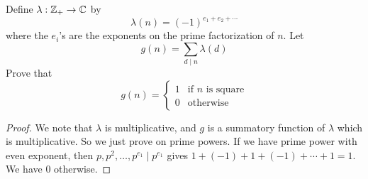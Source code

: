 \begin{problem}
Define $\lambda : \mathbb Z_+\to \mathbb C$ by
\[\lambda(n) = (-1)^{e_1 + e_2 + \cdots}\]
where the $e_i$'s are the exponents on the prime factorization of $n$. Let
\[g(n) = \sum_{d\mid n}\lambda(d)\]
Prove that
\[g(n) = \begin{cases}
        1 & \text{if $n$ is square} \\
        0 & \text{otherwise}
    \end{cases}\]
\end{problem}
\begin{proof}
    We note that $\lambda$ is multiplicative, and $g$ is a summatory function of $\lambda$ which is multiplicative. So we just prove on prime powers. If we have prime power with even exponent, then $p, p^2, \dots, p^{e_1}\mid p^{e_1}$ gives $1 + (-1) + 1 + (-1) + \cdots + 1 = 1$. We have $0$ otherwise.
\end{proof}